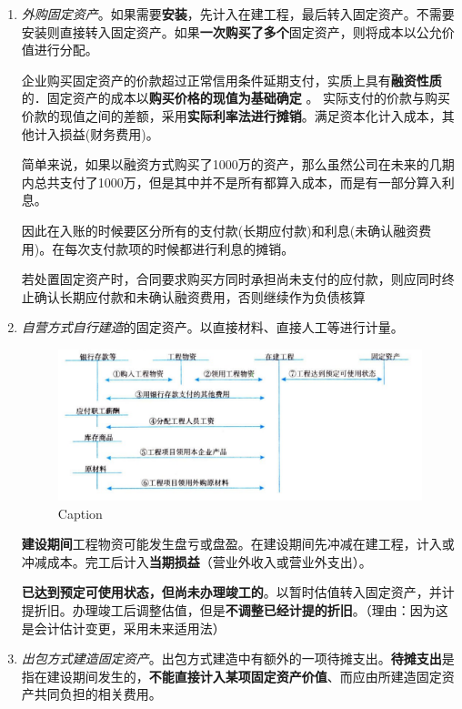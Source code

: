 \documentclass[UTF8,12pt]{ctexart}
\numberwithin{equation}{section} %
\numberwithin{figure}{section}
\numberwithin{table}{section}
\begin{document}
	\begin{enumerate}
		\item \textit{外购固定资产}。如果需要\textbf{安装}，先计入在建工程，最后转入固定资产。不需要安装则直接转入固定资产。如果\textbf{一次购买了多个}固定资产，则将成本以公允价值进行分配。
		
		企业购买固定资产的价款超过正常信用条件延期支付，实质上具有\textbf{融资性质}的．固定资产的成本以\textbf{购买价格的现值为基础确定} 。 实际支付的价款与购买价款的现值之间的差额，采用\textbf{实际利率法进行摊销}。满足资本化计入成本，其他计入损益(财务费用)。
		
		简单来说，如果以融资方式购买了1000万的资产，那么虽然公司在未来的几期内总共支付了1000万，但是其中并不是所有都算入成本，而是有一部分算入利息。
		
		因此在入账的时候要区分所有的支付款(长期应付款)和利息(未确认融资费用)。在每次支付款项的时候都进行利息的摊销。
		
		若处置固定资产时，合同要求购买方同时承担尚未支付的应付款，则应同时终止确认长期应付款和未确认融资费用，否则继续作为负债核算
		
		\item \textit{自营方式自行建造}的固定资产。以直接材料、直接人工等进行计量。
		\begin{figure}[htp]
			\centering
			\includegraphics[width=1\linewidth]{pic/3.1.png}
			\caption{Caption}
			\label{fig:enter-label}
		\end{figure}
		
		\textbf{建设期间}工程物资可能发生盘亏或盘盈。在建设期间先冲减在建工程，计入或冲减成本。完工后计入\textbf{当期损益}（营业外收入或营业外支出）。
		
		\textbf{已达到预定可使用状态，但尚未办理竣工的}。以暂时估值转入固定资产，并计提折旧。办理竣工后调整估值，但是\textbf{不调整已经计提的折旧}。（理由：因为这是会计估计变更，采用未来适用法）
		
		\item \textit{出包方式建造固定资产}。出包方式建造中有额外的一项待摊支出。\textbf{待摊支出}是指在建设期间发生的，\textbf{不能直接计入某项固定资产价值}、而应由所建造固定资产共同负担的相关费用。
		

\end{enumerate}
\end{document}
